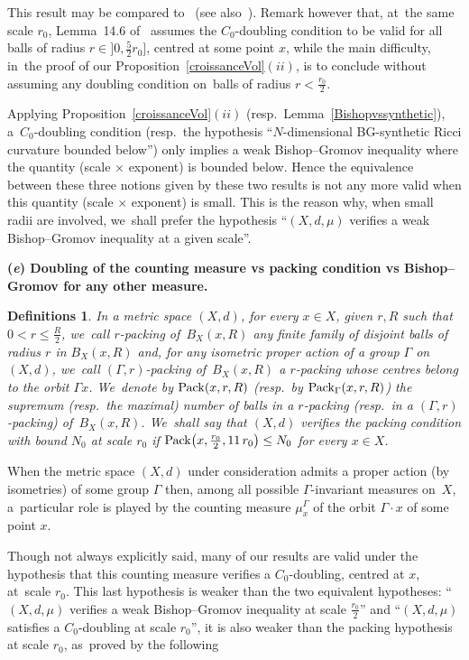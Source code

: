 \documentclass[10pt,a4paper]{amsart}
\numberwithin{equation}{section}
\newtheorem{defis}[theor]{Definitions}
\begin{document}
This result may be compared to~\cite[Lemma~14.6]{HK} (see also~\cite[inequality (21)]{HK}). Remark however that, at~the same scale $r_0$,
Lemma~14.6 of~\cite{HK} assumes the $C_0$-doubling condition to be valid for all balls of radius $r \in \big]0,\frac{5}{2} r_0\big]$, centred at some point $x$, while the main difficulty, in~the proof of our Proposition~\ref{croissanceVol}$(ii)$, is to conclude without assuming any doubling condition on~balls
of radius $r < \frac{r_0}{2}$.

Applying Proposition~\ref{croissanceVol}$(ii)$ (resp.\ Lemma~\ref{Bishopvssynthetic}), a~$C_0$-doubling condition (resp.\ the hypo\-thesis ``$N$-dimensional
BG-synthetic Ricci curvature bounded below'') only implies a weak Bishop--Gromov inequality where the quantity (scale$\,\times \,$exponent) is bounded below.
Hence the equivalence between these three notions given by these two results is not any more valid when this quantity (scale$\,\times \,$exponent)
is small. This is the reason why, when small radii are involved, we~shall
prefer the hypothesis
``$(X,d, \mu)$ verifies a weak Bishop--Gromov inequality at a given
scale''.

\medskip\noindent
{\bf (\emph{e}) Doubling of the counting measure vs packing condition vs Bishop--Gromov for any other measure.}
\begin{defis}\label{packings}
In a metric space $(X,d)$, for every $x \in X$, given $r, R$ such that $0 < r \le \frac{R}{2}$, we~call $r$-packing of~$B_X (x, R)$ any finite family
of disjoint balls of radius $r$ in $B_X (x, R)$ and, for any isometric proper action of a group $\Gamma$
on $(X,d)$, we~call $(\Gamma,r)$-packing of~$B_X (x, R)$ a $r$-packing whose centres belong to the orbit $\Gamma x$. We~denote by ${\rm Pack} (x, r, R)$ (resp.\ by ${\rm Pack}_\Gamma (x, r, R)$) the supremum (resp.\ the maximal) number of balls in a $ r$-packing (resp.\ in a
$(\Gamma,r)$-packing) of~$B_X (x, R)$. We~shall say that $(X,d)$ verifies the packing condition with bound $N_0$
at scale $r_0$ if ${\rm Pack} \big(x, \frac{r_0}{2}, 11\, r_0\big) \le N_0$ for every $x \in X$.
\end{defis}

When the metric space $(X,d)$ under consideration admits a proper action (by isometries) of some group $\Gamma$ then, among all possible $\Gamma$-invariant measures on~$X$, a~particular role is played by the counting measure $\mu_x^\Gamma$ of the orbit $\Gamma \cdot x$ of some point $x$.

Though not always explicitly said, many of our results are valid under the hypothesis that this counting measure verifies a $ C_0 $-doubling,
centred at $ x $, at~scale $ r_0 $. This last hypothesis is weaker
than the two equivalent hypotheses: ``$(X,d, \mu)$ verifies a weak
Bishop--Gromov inequality at scale $\frac{r_0}{2}$'' and
``$(X,d, \mu)$ satisfies a $C_0$-doubling at scale $r_0$'', it is also weaker than the packing hypothesis at scale $r_0$, as~proved by the following
\end{document}
